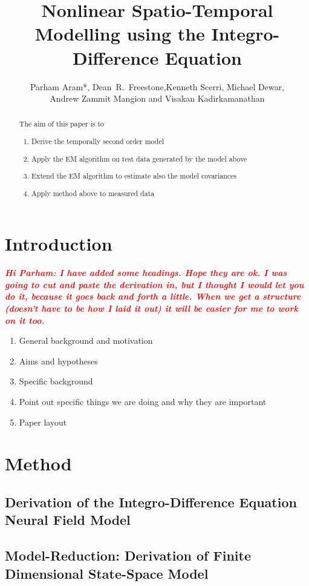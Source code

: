 \documentclass[a4paper,10pt]{article}
\title{Nonlinear Spatio-Temporal Modelling using the Integro-Difference Equation}
\author{Parham Aram*,
        Dean~R.~Freestone,Kenneth Scerri, Michael Dewar,\\ Andrew Zammit Mangion and Visakan Kadirkamanathan}
\newcommand{\dean}[1]{\textsf{\emph{\textbf{\textcolor{red}{#1}}}}}
\begin{document}
\maketitle

\begin{abstract}
The aim of this paper is to 	
\begin{enumerate}
	\item Derive the temporally second order model
	\item Apply the EM algorithm on test data generated by the model above
	\item Extend the EM algorithm to estimate also the model covariances
	\item Apply method above to measured data
\end{enumerate}


\end{abstract}

\section{Introduction}
\dean{Hi Parham: I have added some headings. Hope they are ok. I was going to cut and paste the derivation in, but I thought I would let you do it, because it goes back and forth a little. When we get a structure (doesn't have to be how I laid it out) it will be easier for me to work on it too.}
\begin{enumerate}
	\item General background and motivation
	\item Aims and hypotheses
	\item Specific background
	\item Point out specific things we are doing and why they are important
	\item Paper layout
\end{enumerate}

\section{Method}
\subsection{Derivation of the Integro-Difference Equation Neural Field Model}

\subsection{Model-Reduction: Derivation of Finite Dimensional State-Space Model}
\end{document}
